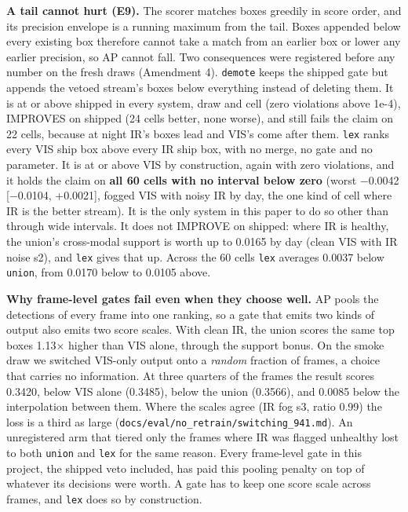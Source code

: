 \documentclass[10pt]{article}
\begin{document}
\textbf{A tail cannot hurt (E9).} The scorer matches boxes greedily in score order, and its precision envelope is a running maximum from the tail. Boxes appended below every existing box therefore cannot take a match from an earlier box or lower any earlier precision, so AP cannot fall. Two consequences were registered before any number on the fresh draws (Amendment 4). \texttt{demote} keeps the shipped gate but appends the vetoed stream's boxes below everything instead of deleting them. It is at or above shipped in every system, draw and cell (zero violations above 1e-4), IMPROVES on shipped (24 cells better, none worse), and still fails the claim on 22 cells, because at night IR's boxes lead and VIS's come after them. \texttt{lex} ranks every VIS ship box above every IR ship box, with no merge, no gate and no parameter. It is at or above VIS by construction, again with zero violations, and it holds the claim on \textbf{all 60 cells with no interval below zero} (worst $-$0.0042 [$-$0.0104, +0.0021], fogged VIS with noisy IR by day, the one kind of cell where IR is the better stream). It is the only system in this paper to do so other than through wide intervals. It does not IMPROVE on shipped: where IR is healthy, the union's cross-modal support is worth up to 0.0165 by day (clean VIS with IR noise s2), and \texttt{lex} gives that up. Across the 60 cells \texttt{lex} averages 0.0037 below \texttt{union}, from 0.0170 below to 0.0105 above.

\textbf{Why frame-level gates fail even when they choose well.} AP pools the detections of every frame into one ranking, so a gate that emits two kinds of output also emits two score scales. With clean IR, the union scores the same top boxes 1.13$\times$ higher than VIS alone, through the support bonus. On the smoke draw we switched VIS-only output onto a \emph{random} fraction of frames, a choice that carries no information. At three quarters of the frames the result scores 0.3420, below VIS alone (0.3485), below the union (0.3566), and 0.0085 below the interpolation between them. Where the scales agree (IR fog s3, ratio 0.99) the loss is a third as large (\texttt{docs/\allowbreak{}eval/\allowbreak{}no\_\allowbreak{}retrain/\allowbreak{}switching\_\allowbreak{}941.md}). An unregistered arm that tiered only the frames where IR was flagged unhealthy lost to both \texttt{union} and \texttt{lex} for the same reason. Every frame-level gate in this project, the shipped veto included, has paid this pooling penalty on top of whatever its decisions were worth. A gate has to keep one score scale across frames, and \texttt{lex} does so by construction.
\end{document}

